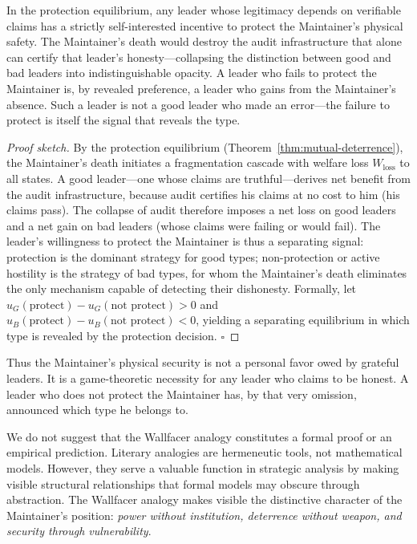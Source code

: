 \documentclass[12pt,a4paper]{ctexart}
\theoremstyle{definition}
\theoremstyle{remark}
\begin{document}
\begin{corollary}
\label{cor:good-leader-protection}
In the protection equilibrium, any leader whose legitimacy depends on verifiable claims has a strictly self-interested incentive to protect the Maintainer's physical safety. The Maintainer's death would destroy the audit infrastructure that alone can certify that leader's honesty—collapsing the distinction between good and bad leaders into indistinguishable opacity. A leader who fails to protect the Maintainer is, by revealed preference, a leader who gains from the Maintainer's absence. Such a leader is not a good leader who made an error—the failure to protect is itself the signal that reveals the type.
\end{corollary}

\begin{proof}[Proof sketch]
By the protection equilibrium (Theorem~\ref{thm:mutual-deterrence}), the Maintainer's death initiates a fragmentation cascade with welfare loss $W_{\text{loss}}$ to all states. A good leader—one whose claims are truthful—derives net benefit from the audit infrastructure, because audit certifies his claims at no cost to him (his claims pass). The collapse of audit therefore imposes a net loss on good leaders and a net gain on bad leaders (whose claims were failing or would fail). The leader's willingness to protect the Maintainer is thus a separating signal: protection is the dominant strategy for good types; non-protection or active hostility is the strategy of bad types, for whom the Maintainer's death eliminates the only mechanism capable of detecting their dishonesty. Formally, let $u_G(\text{protect}) - u_G(\text{not protect}) > 0$ and $u_B(\text{protect}) - u_B(\text{not protect}) < 0$, yielding a separating equilibrium in which type is revealed by the protection decision. $\square$
\end{proof}

Thus the Maintainer's physical security is not a personal favor owed by grateful leaders. It is a game-theoretic necessity for any leader who claims to be honest. A leader who does not protect the Maintainer has, by that very omission, announced which type he belongs to.

We do not suggest that the Wallfacer analogy constitutes a formal proof or an empirical prediction. Literary analogies are hermeneutic tools, not mathematical models. However, they serve a valuable function in strategic analysis by making visible structural relationships that formal models may obscure through abstraction. The Wallfacer analogy makes visible the distinctive character of the Maintainer's position: \textit{power without institution, deterrence without weapon, and security through vulnerability}.
\end{document}
